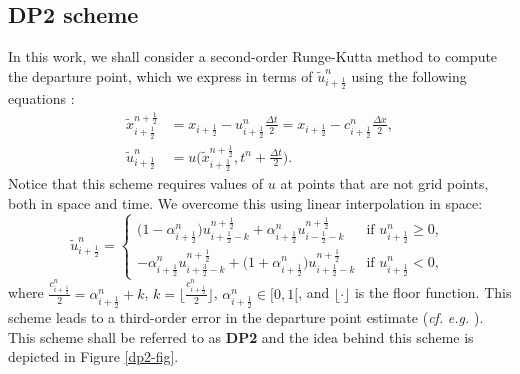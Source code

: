 \subsection{DP2 scheme}
\label{chp-adv1d-sec-DP2}
In this work, we shall
consider a second-order Runge-Kutta method to compute the departure point, which we express in terms of
$\tilde{u}^n_{i+\frac{1}{2}}$ using the following equations \citep{durran:2010}:
\begin{align}
	\label{chp-sec-flux:dp_DP2}
	\tilde{x}_{i+\frac{1}{2}}^{n+\frac{1}{2}} &= x_{i+\frac{1}{2}} - u_{i+\frac{1}{2}}^n
	 \frac{\Delta t}{2} = x_{i+\frac{1}{2}} - c_{i+\frac{1}{2}}^n \frac{\Delta x}{2}, \nonumber \\
	\tilde{u}^n_{i+\frac{1}{2}} &= u\bigg(\tilde{x}^{n+\frac{1}{2}}_{i+\frac{1}{2}}, t^n + \frac{\Delta t}{2}\bigg).
\end{align}
Notice that this scheme requires values of $u$ at points that are not grid points,
both in space and time. We overcome this using linear interpolation in space:
\begin{equation}
	\tilde{u}^n_{i+\frac{1}{2}} =
	\begin{cases}
		\big(1-\alpha_{i+\frac{1}{2}}^n \big)u^{n+\frac{1}{2}}_{i+\frac{1}{2}-k} +
        \alpha_{i+\frac{1}{2}}^n u^{n+\frac{1}{2}}_{i-\frac{1}{2}-k} & \text{if } {u}^n_{i+\frac{1}{2}}\geq 0,\\
		-\alpha_{i+\frac{1}{2}}^n u^{n+\frac{1}{2}}_{i+\frac{3}{2}-k} + \big(1+\alpha_{i+\frac{1}{2}}^n\big)
        u^{n+\frac{1}{2}}_{i+\frac{1}{2}-k} & \text{if } {u}^n_{i+\frac{1}{2}} < 0,\
	\end{cases}
\end{equation}
where $\frac{c_{i+\frac{1}{2}}^n}{2} = \alpha_{i+\frac{1}{2}}^n + k$, 
$k=\lfloor \frac{c_{i+\frac{1}{2}}^n}{2} \rfloor$, $\alpha_{i+\frac{1}{2}}^n \in [0,1[$, and $\lfloor \cdot \rfloor$ is
the floor function. This scheme leads to a third-order error in the departure point estimate (\textit{cf.} \textit{e.g.} 
\citet[Section 7.1.2]{durran:2010}).
This scheme shall be referred to as \textbf{DP2} and the idea behind this scheme is depicted in Figure \ref{dp2-fig}.

